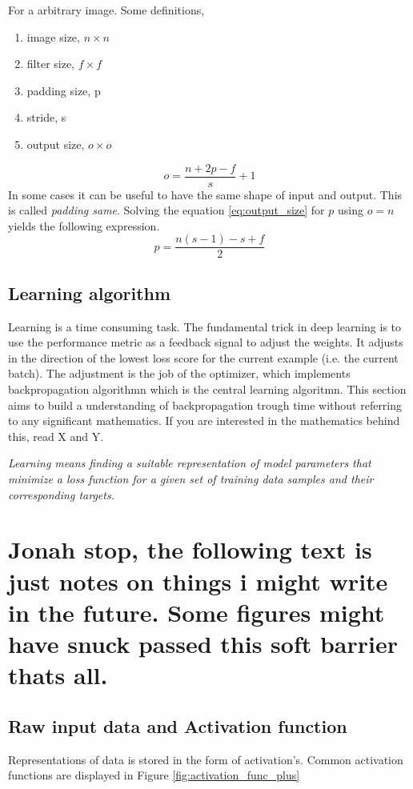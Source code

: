 \documentclass{article}
\begin{document}
For a arbitrary image. Some definitions,
\begin{enumerate}
    \item image size, $n\times n$
    \item filter size, $f\times f$
    \item padding size, p
    \item stride, s
    \item output size, $o \times o$
\end{enumerate}

\begin{equation} \label{eq:output_size}
    o = \frac{n+2p-f}{s} + 1
\end{equation}
In some cases it can be useful to have the same shape of input and output. This is called \textit{padding same}. Solving the equation \eqref{eq:output_size} for $p$ using $o=n$ yields the following expression.
\begin{equation} \label{eq:padding_same}
    p = \frac{n\left(s-1\right)-s+f}{2}
\end{equation}

\subsection{Learning algorithm} \label{sec:backprop_learning_algorithm}
Learning is a time consuming task. The fundamental trick in deep learning is to use the performance metric as a feedback signal to adjust the weights. It adjusts in the direction of the lowest loss score for the current example (i.e. the current batch). The adjustment is the job of the optimizer, which implements backpropagation algorithmn which is the central learning algoritmn. This section aims to build a understanding of backpropagation trough time without referring to any significant mathematics. If you are interested in the mathematics behind this, read X and Y. 

\textit{Learning means finding a suitable representation of model parameters that minimize a loss function for a given set of training data samples and their corresponding targets.}

\section{Jonah stop, the following text is just notes on things i might write in the future. Some figures might have snuck passed this soft barrier thats all.}

\subsection{Raw input data and Activation function}
Representations of data is stored in the form of activation's. Common activation functions are displayed in Figure \ref{fig:activation_func_plus}
\end{document}
